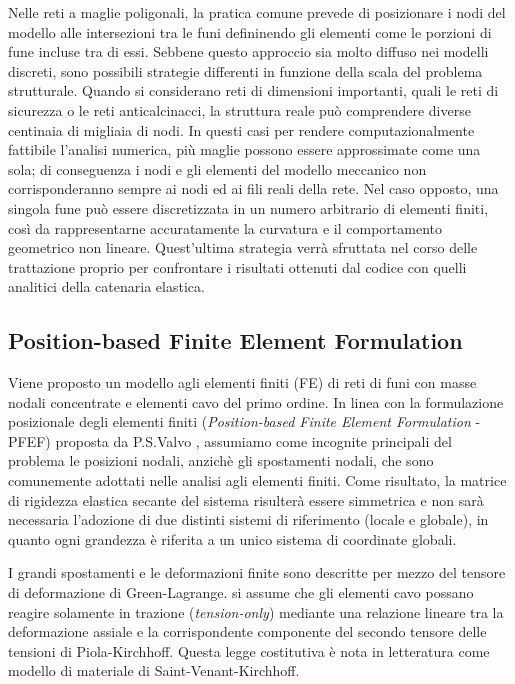 Nelle reti a maglie poligonali, la pratica comune prevede di posizionare i nodi del modello alle intersezioni tra le funi defininendo gli elementi come le porzioni di fune incluse tra di essi. Sebbene questo approccio sia molto diffuso nei modelli discreti, sono possibili strategie differenti in funzione della scala del problema strutturale. Quando si considerano reti di dimensioni importanti, quali le reti di sicurezza o le reti anticalcinacci, la struttura reale può comprendere diverse centinaia di migliaia di nodi. In questi casi per rendere computazionalmente fattibile l'analisi numerica, più maglie possono essere approssimate come una sola; di conseguenza i nodi e gli elementi del modello meccanico non corrisponderanno sempre ai nodi ed ai fili reali della rete. Nel caso opposto, una singola fune può essere discretizzata in un numero arbitrario di elementi finiti, così da rappresentarne accuratamente la curvatura e il comportamento geometrico non lineare. Quest'ultima strategia verrà sfruttata nel corso delle trattazione proprio per confrontare i risultati ottenuti dal codice con quelli analitici della catenaria elastica. 

\subsection{Position-based Finite Element Formulation}

Viene proposto un modello agli elementi finiti (FE) di reti di funi con masse nodali concentrate e elementi cavo del primo ordine. In linea con la formulazione posizionale degli elementi finiti (\textit{Position-based Finite Element Formulation} - PFEF) proposta da P.S.Valvo \cite{Valvo1,Valvo2}, assumiamo come incognite principali del problema le posizioni nodali, anzichè gli spostamenti nodali, che sono comunemente adottati nelle analisi agli elementi finiti. Come risultato, la matrice di rigidezza elastica secante del sistema risulterà essere simmetrica e non sarà necessaria l'adozione di due distinti sistemi di riferimento (locale e globale), in quanto ogni grandezza è riferita a un unico sistema di coordinate globali. 

I grandi spostamenti e le deformazioni finite sono descritte per mezzo del tensore di deformazione di Green-Lagrange. si assume che gli elementi cavo possano reagire solamente in trazione (\textit{tension-only}) mediante una relazione lineare tra la deformazione assiale e la corrispondente componente del secondo tensore delle tensioni di Piola-Kirchhoff. Questa legge costitutiva è nota in letteratura come modello di materiale di Saint-Venant-Kirchhoff. 

